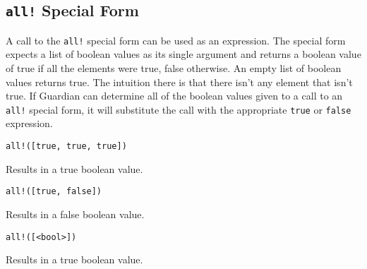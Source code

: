 
\subsection{\texttt{all!} Special Form}
{
	A call to the \texttt{all!} special form can be used as an expression.
	The special form expects a list of boolean values as its
	single argument and returns a boolean value of true if all the elements
	were true, false otherwise. An empty list of boolean values returns true.
	The intuition there is that there isn't any element that isn't true.
	If Guardian can determine all of the boolean values given to a call to an
	\texttt{all!} special form, it will substitute the call with the
	appropriate \texttt{true} or \texttt{false} expression.
	
	\begin{itemize}
	{
		\item \texttt{all!([true, true, true])}
		
			Results in a true boolean value.
		
		\item \texttt{all!([true, false])}
		
			Results in a false boolean value.
		
		\item \texttt{all!([<bool>])}
		
			Results in a true boolean value.
	}
	\end{itemize}
}
